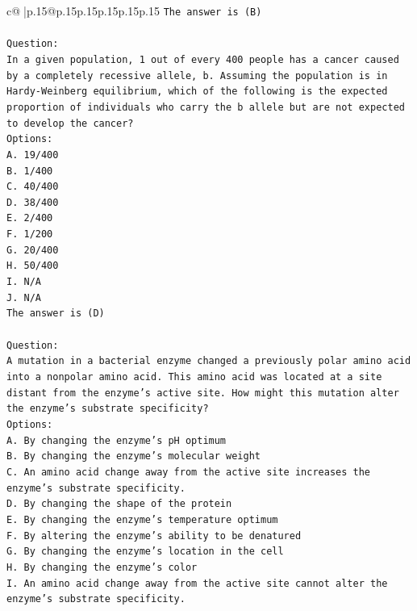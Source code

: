 \documentclass{article}
\begin{document}
{\begin{supertabular}{c@{$\;$}|p{.15\linewidth}@{}p{.15\linewidth}p{.15\linewidth}p{.15\linewidth}p{.15\linewidth}p{.15\linewidth}}
{{{\texttt{The answer is (B)} \\
\\ 
\texttt{Question:} \\
\texttt{In a given population, 1 out of every 400 people has a cancer caused by a completely recessive allele, b. Assuming the population is in Hardy{-}Weinberg equilibrium, which of the following is the expected proportion of individuals who carry the b allele but are not expected to develop the cancer?} \\
\texttt{Options:} \\
\texttt{A. 19/400} \\
\texttt{B. 1/400} \\
\texttt{C. 40/400} \\
\texttt{D. 38/400} \\
\texttt{E. 2/400} \\
\texttt{F. 1/200} \\
\texttt{G. 20/400} \\
\texttt{H. 50/400} \\
\texttt{I. N/A} \\
\texttt{J. N/A} \\
\texttt{The answer is (D)} \\
\\ 
\texttt{Question:} \\
\texttt{A mutation in a bacterial enzyme changed a previously polar amino acid into a nonpolar amino acid. This amino acid was located at a site distant from the enzyme’s active site. How might this mutation alter the enzyme’s substrate specificity?} \\
\texttt{Options:} \\
\texttt{A. By changing the enzyme’s pH optimum} \\
\texttt{B. By changing the enzyme's molecular weight} \\
\texttt{C. An amino acid change away from the active site increases the enzyme's substrate specificity.} \\
\texttt{D. By changing the shape of the protein} \\
\texttt{E. By changing the enzyme's temperature optimum} \\
\texttt{F. By altering the enzyme's ability to be denatured} \\
\texttt{G. By changing the enzyme’s location in the cell} \\
\texttt{H. By changing the enzyme's color} \\
\texttt{I. An amino acid change away from the active site cannot alter the enzyme’s substrate specificity.} \\
}}}
\end{supertabular}}
\end{document}
